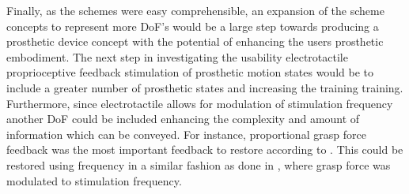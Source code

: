 Finally, as the schemes were easy comprehensible, an expansion of the scheme concepts to represent more DoF's would be a large step towards producing a prosthetic device concept with the potential of enhancing the users prosthetic embodiment. The next step in investigating the usability electrotactile proprioceptive feedback stimulation of prosthetic motion states would be to include a greater number of prosthetic states and increasing the training training. Furthermore, since electrotactile allows for modulation of stimulation frequency another DoF could be included enhancing the complexity and amount of information which can be conveyed. For instance, proportional grasp force feedback was the most important feedback to restore according to \cite{Peerdeman2011}. This could be restored using frequency in a similar fashion as done in \cite{Dosen2016}, where grasp force was modulated to stimulation frequency. 
 



